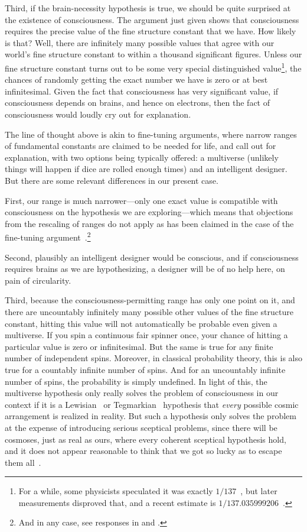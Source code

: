 Third, if the brain-necessity hypothesis is true, we should be quite surprised at the existence
of consciousness. The argument just given shows that consciousness requires the precise value of
the fine structure constant that we have. How likely is that? Well, there are infinitely
many possible values that agree with our world's fine structure constant to within a thousand
significant figures. Unless our fine structure constant turns out to be some very special distinguished
value\footnote{For a while, some physicists speculated it was exactly $1/137$~\parencite{Kragh2003}, but later measurements 
disproved that, and a recent estimate is $1/137.035999206$~\parencite{Morel2020}.}, the chances of randomly getting the exact number
we have is zero or at best infinitesimal. Given the fact that consciousness has very significant value, 
if consciousness depends on brains, and hence on electrons, then
the fact of consciousness would loudly cry out for explanation. 

The line of thought above is akin to fine-tuning arguments, where narrow ranges of fundamental constants
are claimed to be needed for life, and call out for explanation, with two options being typically offered:
a multiverse (unlikely things will happen if dice are rolled enough times) and an intelligent designer. But there are
some relevant differences in our present case. 

First, our range is much narrower---only one exact
value is compatible with consciousness on the hypothesis we are exploring---which means that objections from
the rescaling of ranges do not apply as has been claimed in the case of the fine-tuning argument~\parencite{MMV2001}.\footnote{And in any case, see responses in  and .}

Second, plausibly an intelligent designer
would be conscious, and if consciousness requires brains as we are hypothesizing, a designer will be of no help
here, on pain of circularity. 

Third, because the consciousness-permitting range has only one point on it, 
and there are uncountably infinitely many possible other values of the fine structure constant, hitting this value
will not automatically be probable even given a multiverse. If you spin a continuous fair spinner once, 
your chance of hitting a particular value is zero or infinitesimal. But the same is true for any finite number of independent spins.
Moreover, in classical probability theory, this is also true for a countably infinite number of spins. And for an
uncountably infinite number of spins, the probability is simply undefined. In light of this, the multiverse hypothesis only
really solves the problem of consciousness in our context if it is a Lewisian~\parencite{LewisPlurality1986} or 
Tegmarkian~\parencite{Tegmark} hypothesis that \textit{every} 
possible cosmic arrangement is realized in reality. But such a hypothesis only solves the problem at the expense of introducing serious
sceptical problems, since there will be cosmoses, just as real as ours, where every coherent sceptical hypothesis hold, and it does
not appear reasonable to think that we got so lucky as to escape them all~.

